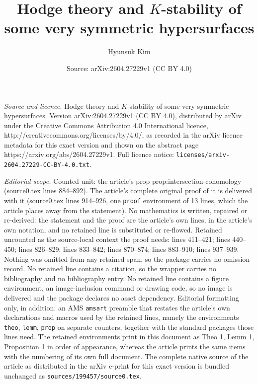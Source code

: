 \documentclass[10pt,a4paper]{amsart}
\title{Hodge theory and $K$-stability of some very symmetric hypersurfaces}
\author{Hyunsuk Kim}
\date{Source: arXiv:2604.27229v1 (CC BY 4.0)}
\begin{document}
\maketitle

\noindent\emph{Source and licence.} Hodge theory and $K$-stability of some very symmetric hypersurfaces. Version arXiv:2604.27229v1 (CC BY 4.0), distributed by arXiv under the Creative Commons Attribution 4.0 International licence, http://creativecommons.org/licenses/by/4.0/, as recorded in the arXiv licence metadata for this exact version and shown on the abstract page https://arxiv.org/abs/2604.27229v1. Full licence notice: \texttt{licenses/arxiv-2604.27229-CC-BY-4.0.txt}.\par\smallskip

\noindent\textit{Editorial scope.} Counted unit: the article's prop prop:intersection-cohomology (source0.tex lines 884--892). The article's complete original proof of it is delivered with it (source0.tex lines 914--926, one \texttt{proof} environment of 13 lines, which the article places away from the statement). No mathematics is written, repaired or re-derived: the statement and the proof are the article's own lines, in the article's own notation, and no retained line is substituted or re-flowed.  Retained uncounted as the source-local context the proof needs: lines 411--421; lines 440--450; lines 826--829; lines 833--842; lines 870--874; lines 883--910; lines 937--939.  Nothing was omitted from any retained span, so the package carries no omission record.  No retained line contains a citation, so the wrapper carries no bibliography and no bibliography entry.  No retained line contains a figure environment, an image-inclusion command or drawing code, so no image is delivered and the package declares no asset dependency.  Editorial formatting only, in addition: an AMS \texttt{amsart} preamble that restates the article's own declarations and macros used by the retained lines, namely the environments \texttt{theo}, \texttt{lemm}, \texttt{prop} on separate counters, together with the standard packages those lines need.  The retained environments print in this document as Theo 1, Lemm 1, Proposition 1 in order of appearance, whereas the article prints the same items with the numbering of its own full document.  The complete native source of the article as distributed in the arXiv e-print for this exact version is bundled unchanged as \texttt{sources/199457/source0.tex}.
\end{document}
